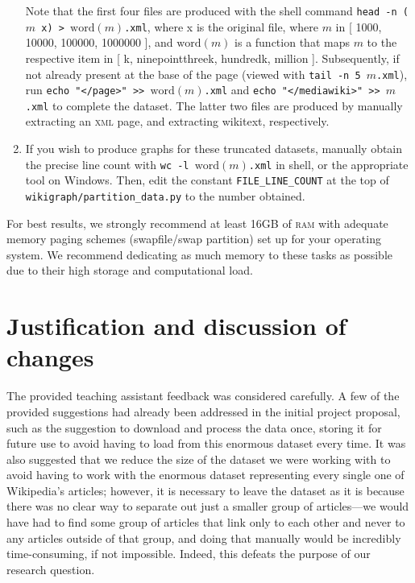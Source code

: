 \documentclass[fontsize=12pt]{article}
\newcommand{\py}[1]{\texttt{#1}}
\begin{document}
\begin{multicols}{2}
\begin{enumerate}
        Note that the first four files are produced with the shell command \texttt{head -n (\(m\) x) > \(\text{word}(m)\).xml}, where x is the original file, where \(m\) in [ 1000, 10000, 100000, 1000000 ], and \(\text{word}(m)\) is a function that maps \(m\) to the respective item in [ k, ninepointthreek, hundredk, million ].
        Subsequently, if not already present at the base of the page (viewed with \texttt{tail -n 5 \(m\).xml}), run \texttt{echo "</page>" >> \(\text{word}(m)\).xml} and \texttt{echo "</mediawiki>" >> \(m\).xml} to complete the dataset.
        The latter two files are produced by manually extracting an \textsc{xml} page, and extracting wikitext, respectively.
  \item If you wish to produce graphs for these truncated datasets, manually obtain the precise line count with \texttt{wc -l \(\text{word}(m)\).xml} in shell, or the appropriate tool on Windows.
        Then, edit the constant \py{FILE_LINE_COUNT} at the top of \texttt{wikigraph/partition\_data.py} to the number obtained.
\end{enumerate}

For best results, we strongly recommend at least 16GB of \textsc{ram} with adequate memory paging schemes (swapfile/swap partition) set up for your operating system.
We recommend dedicating as much memory to these tasks as possible due to their high storage and computational load.

    \section{Justification and discussion of changes}

    The provided teaching assistant feedback was considered carefully.
    A few of the provided suggestions had already been addressed in the initial project proposal, such as the suggestion to download and process the data once, storing it for future use to avoid having to load from this enormous dataset every time.
    It was also suggested that we reduce the size of the dataset we were working with to avoid having to work with the enormous dataset representing every single one of Wikipedia's articles; however, it is necessary to leave the dataset as it is because there was no clear way to separate out just a smaller group of articles---we would have had to find some group of articles that link only to each other and never to any articles outside of that group, and doing that manually would be incredibly time-consuming, if not impossible.
    Indeed, this defeats the purpose of our research question.


\end{multicols}
\end{document}
